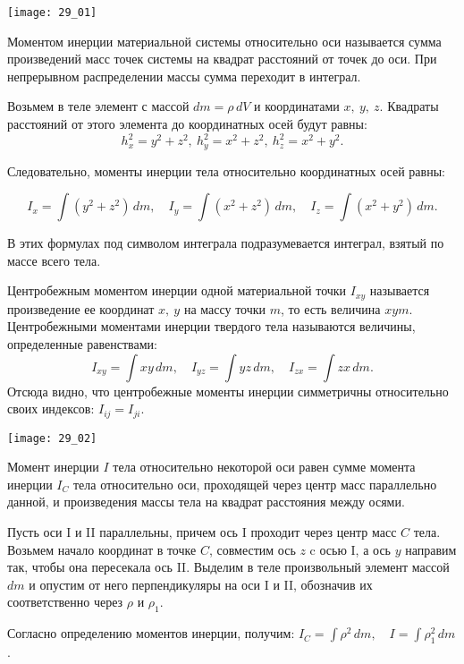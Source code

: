 
\begin{minipage}{.38\textwidth}
    \texttt{[image: 29\_01]}
\end{minipage} \hfill
\begin{minipage}{.57\textwidth}
    Моментом инерции материальной системы относительно оси называется сумма
    произведений масс точек системы на квадрат расстояний от точек до оси. При
    непрерывном распределении массы сумма переходит в интеграл.

    Возьмем в теле элемент с массой \( dm = \rho\,dV \) и координатами
    \( x,\ y,\ z \). Квадраты расстояний от этого элемента до координатных осей
    будут равны:
    \[
        h_x^2 = y^2 + z^2,\ h_y^2 = x^2 + z^2,\ h_z^2 = x^2 + y^2.
    \]
    
    Следовательно, моменты инерции тела относительно координатных осей равны:
\end{minipage}
\[
    I_x = \int(y^2 + z^2)\,dm, \quad I_y = \int(x^2 + z^2)\,dm, \quad
    I_z = \int(x^2 + y^2)\,dm.
\]

В этих формулах под символом интеграла подразумевается интеграл, взятый по массе
всего тела.

Центробежным моментом инерции одной материальной точки \( I_{xy} \) называется
произведение ее координат \( x,\ y \) на массу точки \( m \), то есть величина
\( xym \). Центробежными моментами инерции твердого тела называются величины,
определенные равенствами:
\[
    I_{xy} = \int xy\,dm,\quad I_{yz} = \int yz\,dm,\quad I_{zx} = \int zx\,dm.
\]
Отсюда видно, что центробежные моменты инерции симметричны относительно своих индексов:
\( I_{ij} = I_{ji} \).

\begin{minipage}{.38\textwidth}
    \texttt{[image: 29\_02]}
\end{minipage} \hfill
\begin{minipage}{.57\textwidth}
    Момент инерции \( I \) тела относительно некоторой оси равен сумме момента
    инерции \( I_C \) тела относительно оси, проходящей через центр масс
    параллельно данной, и произведения массы тела на квадрат расстояния между
    осями.

    Пусть оси I и II параллельны, причем ось I проходит через центр масс \( C \)
    тела. Возьмем начало координат в точке \( C \), совместим ось \( z \) c осью
    I, а ось \( y \) направим так, чтобы она пересекала ось II. Выделим в теле
    произвольный элемент массой \( dm \) и опустим от него перпендикуляры на оси
    I и II, обозначив их соответственно через \( \rho \) и \( \rho_1 \).
\end{minipage}
Согласно определению моментов инерции, получим: \( I_C = \int \rho^2\,dm, \quad
I = \int \rho_1^2\,dm \).

